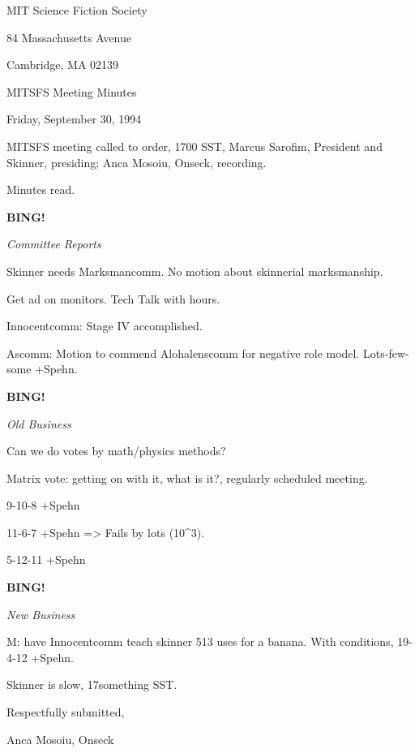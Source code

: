\documentclass[12pt]{article}
\newcommand{\bing}{{\bf BING!} }
\newcommand{\goto}[1]{\bing \vskip 12pt \centerline{{\em{#1}}}}
\begin{document}
\begin{center}

MIT Science Fiction Society 

84 Massachusetts Avenue

Cambridge, MA 02139

\vspace{12pt}

MITSFS Meeting Minutes 

Friday, September 30, 1994

\end{center}
 
\vspace{18pt}

\setlength{\parskip}{6pt}

\noindent
MITSFS meeting called to order, 1700 SST,
Marcus Sarofim, President and Skinner, presiding; Anca Mosoiu, Onseck, recording.

Minutes read.

\goto{Committee Reports}

Skinner needs Marksmancomm. No motion about skinnerial marksmanship.

Get ad on monitors. Tech Talk with hours.

Innocentcomm: Stage IV accomplished.

Ascomm: Motion to commend Alohalenscomm for negative role model. Lots-few-some +Spehn.

\goto{Old Business}

Can we do votes by math/physics methods?

Matrix vote: getting on with it, what is it?, regularly scheduled meeting.

9-10-8 +Spehn

11-6-7 +Spehn => Fails by lots (10^3).

5-12-11 +Spehn

\goto{New Business}

M: have Innocentcomm teach skinner 513 uses for a banana. With conditions, 19-4-12 +Spehn.

\vspace{12pt}

\noindent
Skinner is slow, 17something SST.

\vspace{18pt}

\centerline{Respectfully submitted,}
\centerline{Anca Mosoiu, Onseck}
\end{document}
